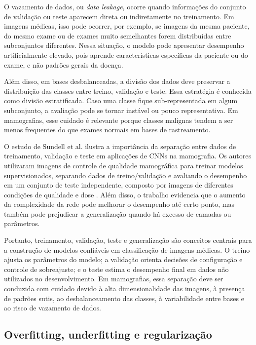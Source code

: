 \documentclass[
    12pt,
    openright,
    oneside,
    a4paper,
    english,
    brazil
]{abntex2}
\begin{document}
O vazamento de dados, ou \textit{data leakage}, ocorre quando informações do conjunto de validação ou teste aparecem direta ou indiretamente no treinamento. Em imagens médicas, isso pode ocorrer, por exemplo, se imagens da mesma paciente, do mesmo exame ou de exames muito semelhantes forem distribuídas entre subconjuntos diferentes. Nessa situação, o modelo pode apresentar desempenho artificialmente elevado, pois aprende características específicas da paciente ou do exame, e não padrões gerais da doença.

Além disso, em bases desbalanceadas, a divisão dos dados deve preservar a distribuição das classes entre treino, validação e teste. Essa estratégia é conhecida como divisão estratificada. Caso uma classe fique sub-representada em algum subconjunto, a avaliação pode se tornar instável ou pouco representativa. Em mamografias, esse cuidado é relevante porque classes malignas tendem a ser menos frequentes do que exames normais em bases de rastreamento.

O estudo de Sundell et al. ilustra a importância da separação entre dados de treinamento, validação e teste em aplicações de CNNs na mamografia. Os autores utilizaram imagens de controle de qualidade mamográfica para treinar modelos supervisionados, separando dados de treino/validação e avaliando o desempenho em um conjunto de teste independente, composto por imagens de diferentes condições de qualidade e dose \cite{sundell2022cnn}. Além disso, o trabalho evidencia que o aumento da complexidade da rede pode melhorar o desempenho até certo ponto, mas também pode prejudicar a generalização quando há excesso de camadas ou parâmetros.

Portanto, treinamento, validação, teste e generalização são conceitos centrais para a construção de modelos confiáveis em classificação de imagens médicas. O treino ajusta os parâmetros do modelo; a validação orienta decisões de configuração e controle de sobreajuste; e o teste estima o desempenho final em dados não utilizados no desenvolvimento. Em mamografias, essa separação deve ser conduzida com cuidado devido à alta dimensionalidade das imagens, à presença de padrões sutis, ao desbalanceamento das classes, à variabilidade entre bases e ao risco de vazamento de dados.

\subsection{Overfitting, underfitting e regularização}
\label{subsec:aumento_regularizacao_overfitting}
\end{document}
